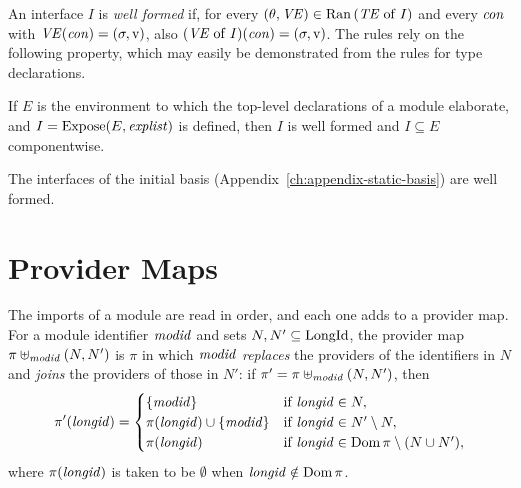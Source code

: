 An interface $I$ is \emph{well formed} if, for every $(\theta, \mathit{VE}) \in
\mathrm{Ran}\,(\mathit{TE} \mathrel{\mathrm{of}} I)$ and every $\mathit{con}$ with $\mathit{VE}(\mathit{con}) = (\sigma, \mathrm{v})$, also $(\mathit{VE}
\mathrel{\mathrm{of}} I)(\mathit{con}) = (\sigma, \mathrm{v})$. The rules rely on the following property,
which may easily be demonstrated from the rules for type declarations.

\begin{property}
If $E$ is the environment to which the top-level declarations of a module
elaborate, and $I = \mathrm{Expose}(E, \mathit{explist})$ is defined, then $I$ is well formed
and $I \subseteq E$ componentwise.
\end{property}

\noindent The interfaces of the initial basis
(Appendix~\ref{ch:appendix-static-basis}) are well formed.

\section{Provider Maps}\label{sec:static-modules-providers}

The imports of a module are read in order, and each one adds to a provider map.
For a module identifier $\mathit{modid}$ and sets $N, N' \subseteq \mathrm{LongId}$, the
provider map $\pi \uplus_{\mathit{modid}} (N, N')$ is $\pi$ in which $\mathit{modid}$
\emph{replaces} the providers of the identifiers in $N$ and \emph{joins} the
providers of those in $N'$: if $\pi' = \pi \uplus_{\mathit{modid}} (N, N')$, then
\[
  \pi'(\mathit{longid}) =
  \begin{cases}
    \{\mathit{modid}\} & \text{if } \mathit{longid} \in N,\\
    \pi(\mathit{longid}) \cup \{\mathit{modid}\} & \text{if } \mathit{longid} \in N' \setminus N,\\
    \pi(\mathit{longid}) & \text{if } \mathit{longid} \in \mathrm{Dom}\,\pi \setminus (N \cup N'),
  \end{cases}
\]
where $\pi(\mathit{longid})$ is taken to be $\emptyset$ when $\mathit{longid} \notin
\mathrm{Dom}\,\pi$. %

